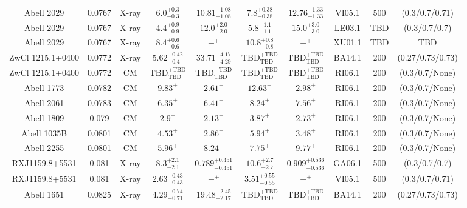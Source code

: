 \begin{table}
\begin{tabular}{cccccccccc}
Abell 2029 & 0.0767 & X-ray & ${6.0}^{+0.3}_{-0.3}$ & ${10.81}^{+1.08}_{-1.08}$ & ${7.8}^{+0.38}_{-0.38}$ & ${12.76}^{+1.33}_{-1.33}$ & VI05.1 & 500 & (0.3/0.7/0.71) \\
Abell 2029 & 0.0767 & X-ray & ${4.4}^{+0.9}_{-0.9}$ & ${12.0}^{+2.0}_{-2.0}$ & ${5.8}^{+1.1}_{-1.1}$ & ${15.0}^{+3.0}_{-3.0}$ & LE03.1 & TBD & (0.3/0.7/0.7) \\
Abell 2029 & 0.0767 & X-ray & ${8.4}^{+0.6}_{-0.6}$ & ${-}^{+}_{}$ & ${10.8}^{+0.8}_{-0.8}$ & ${-}^{+}_{}$ & XU01.1 & TBD & TBD \\
ZwCl 1215.1+0400 & 0.0772 & X-ray & ${5.62}^{+0.42}_{-0.4}$ & ${33.71}^{+4.17}_{-4.29}$ & ${\mathrm{TBD}}^{+\mathrm{TBD}}_{\mathrm{TBD}}$ & ${\mathrm{TBD}}^{+\mathrm{TBD}}_{\mathrm{TBD}}$ & BA14.1 & 200 & (0.27/0.73/0.73) \\
ZwCl 1215.1+0400 & 0.0772 & CM & ${\mathrm{TBD}}^{+\mathrm{TBD}}_{\mathrm{TBD}}$ & ${\mathrm{TBD}}^{+\mathrm{TBD}}_{\mathrm{TBD}}$ & ${\mathrm{TBD}}^{+\mathrm{TBD}}_{\mathrm{TBD}}$ & ${\mathrm{TBD}}^{+\mathrm{TBD}}_{\mathrm{TBD}}$ & RI06.1 & 200 & (0.3/0.7/None) \\
Abell 1773 & 0.0782 & CM & ${9.83}^{+}_{}$ & ${2.61}^{+}_{}$ & ${12.63}^{+}_{}$ & ${2.98}^{+}_{}$ & RI06.1 & 200 & (0.3/0.7/None) \\
Abell 2061 & 0.0783 & CM & ${6.35}^{+}_{}$ & ${6.41}^{+}_{}$ & ${8.24}^{+}_{}$ & ${7.56}^{+}_{}$ & RI06.1 & 200 & (0.3/0.7/None) \\
Abell 1809 & 0.079 & CM & ${2.9}^{+}_{}$ & ${2.13}^{+}_{}$ & ${3.87}^{+}_{}$ & ${2.73}^{+}_{}$ & RI06.1 & 200 & (0.3/0.7/None) \\
Abell 1035B & 0.0801 & CM & ${4.53}^{+}_{}$ & ${2.86}^{+}_{}$ & ${5.94}^{+}_{}$ & ${3.48}^{+}_{}$ & RI06.1 & 200 & (0.3/0.7/None) \\
Abell 2255 & 0.0801 & CM & ${5.96}^{+}_{}$ & ${8.24}^{+}_{}$ & ${7.75}^{+}_{}$ & ${9.77}^{+}_{}$ & RI06.1 & 200 & (0.3/0.7/None) \\
RXJ1159.8+5531 & 0.081 & X-ray & ${8.3}^{+2.1}_{-2.1}$ & ${0.789}^{+0.451}_{-0.451}$ & ${10.6}^{+2.7}_{-2.7}$ & ${0.909}^{+0.536}_{-0.536}$ & GA06.1 & 500 & (0.3/0.7/0.7) \\
RXJ1159.8+5531 & 0.081 & X-ray & ${2.63}^{+0.43}_{-0.43}$ & ${-}^{+}_{}$ & ${3.51}^{+0.55}_{-0.55}$ & ${-}^{+}_{}$ & VI05.1 & 500 & (0.3/0.7/0.71) \\
Abell 1651 & 0.0825 & X-ray & ${4.29}^{+0.74}_{-0.71}$ & ${19.48}^{+2.45}_{-2.17}$ & ${\mathrm{TBD}}^{+\mathrm{TBD}}_{\mathrm{TBD}}$ & ${\mathrm{TBD}}^{+\mathrm{TBD}}_{\mathrm{TBD}}$ & BA14.1 & 200 & (0.27/0.73/0.73) \\

\end{tabular}
\end{table}
